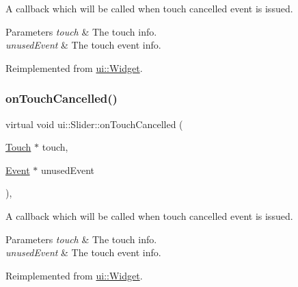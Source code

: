 A callback which will be called when touch cancelled event is issued. 
\begin{DoxyParams}{Parameters}
{\em touch} & The touch info. \\
\hline
{\em unused\+Event} & The touch event info. \\
\hline
\end{DoxyParams}


Reimplemented from \hyperlink{classui_1_1Widget_a8622ea26dcf72e2197d1a1b0d6ce9cbd}{ui\+::\+Widget}.

\mbox{\label{classui_1_1Slider_aa8d68a645ef6e82eb6c48214bd5d8001}} 
\subsubsection{\texorpdfstring{on\+Touch\+Cancelled()}{onTouchCancelled()}\hspace{0.1cm}{\footnotesize\ttfamily [2/2]}}
{\footnotesize\ttfamily virtual void ui\+::\+Slider\+::on\+Touch\+Cancelled (\begin{DoxyParamCaption}\item[{\hyperlink{classTouch}{Touch} $\ast$}]{touch,  }\item[{\hyperlink{classEvent}{Event} $\ast$}]{unused\+Event }\end{DoxyParamCaption})\hspace{0.3cm}{\ttfamily [override]}, {\ttfamily [virtual]}}

A callback which will be called when touch cancelled event is issued. 
\begin{DoxyParams}{Parameters}
{\em touch} & The touch info. \\
\hline
{\em unused\+Event} & The touch event info. \\
\hline
\end{DoxyParams}


Reimplemented from \hyperlink{classui_1_1Widget_a8622ea26dcf72e2197d1a1b0d6ce9cbd}{ui\+::\+Widget}.

\mbox{\label{classui_1_1Slider_afeaab747b9a9b3a71ebc77ff21e86008}} 
